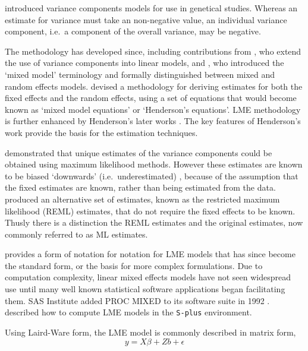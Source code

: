 \documentclass[12pt, a4paper]{report}
\theoremstyle{plain}
\theoremstyle{definition}
\theoremstyle{remark}
\begin{document}
	\citet{Fisher4} introduced variance components models for use in genetical studies. Whereas an estimate for variance must take an non-negative value, an individual variance component, i.e.\ a component of the overall variance, may be negative.
	
	The methodology has developed since, including contributions from
	\citet{tippett}, who extend the use of variance components into linear models, and \citet{eisenhart}, who introduced the `mixed model' terminology and formally distinguished between mixed and random effects models. \citet{Henderson:1950} devised a methodology for deriving estimates for both the fixed effects and the random effects, using a set of equations that would become known as `mixed model equations' or `Henderson's equations'.
	LME methodology is further enhanced by Henderson's later works \citep{Henderson53, Henderson59,Henderson63,Henderson73,Henderson84a}. The key features of Henderson's work provide the basis for the estimation techniques.
	
	\citet{HartleyRao} demonstrated that unique estimates of the variance components could be obtained using maximum likelihood methods. However these estimates are known to be biased `downwards' (i.e.\ underestimated) , because of the assumption that the fixed estimates are known, rather than being estimated from the data. \citet{PattersonThompson} produced an alternative set of estimates, known as the restricted maximum likelihood (REML) estimates, that do not require the fixed effects to be known. Thusly there is a distinction the REML estimates and the original estimates, now commonly referred to as ML estimates.
	
	\citet{LW82} provides a form of notation for notation for LME models that has since become the standard form, or the basis for more complex formulations. Due to computation complexity, linear mixed effects models have not seen widespread use until many well known statistical software applications began facilitating them. SAS Institute added PROC MIXED to its software suite in 1992 \citep{singer}. \citet{PB} described how to compute LME models in the \texttt{S-plus} environment.
	
	Using Laird-Ware form, the LME model is commonly described in matrix form,
	\begin{equation}
	y = X\beta + Zb + \epsilon
	\label{LW}
	\end{equation}
	
\end{document}
